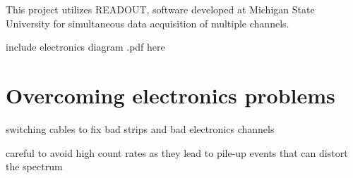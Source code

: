 \indent This project utilizes READOUT, software developed at Michigan State University for simultaneous data acquisition of multiple channels. 

include electronics diagram .pdf here

\section{Overcoming electronics problems}
\indent switching cables to fix bad strips and bad electronics channels


careful to avoid high count rates as they lead to pile-up events that can distort the spectrum \cite{Leo}

 


 